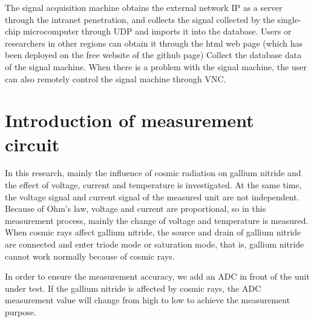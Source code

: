 The signal acquisition machine obtains the external network IP as a server through the intranet penetration, and collects the signal collected by the single-chip microcomputer through UDP and imports it into the database. Users or researchers in other regions can obtain it through the html web page (which has been deployed on the free website of the github page) Collect the database data of the signal machine. When there is a problem with the signal machine, the user can also remotely control the signal machine through VNC.

 
\chapter{Introduction of measurement circuit}
\label{chap:Introduction of measurement circuit}
In this research, mainly the influence of cosmic radiation on gallium nitride and the effect of voltage, current and temperature is investigated. At the same time, the voltage signal and current signal of the measured unit are not independent. Because of Ohm's law, voltage and current are proportional, so in this measurement process, mainly the change of voltage and temperature is measured. When cosmic rays affect gallium nitride, the source and drain of gallium nitride are connected and enter triode mode or saturation mode, that is, gallium nitride cannot work normally because of cosmic rays.

In order to ensure the measurement accuracy, we add an ADC in front of the unit under test. If the gallium nitride is affected by cosmic rays, the ADC measurement value will change from high to low to achieve the measurement purpose. 
\\
